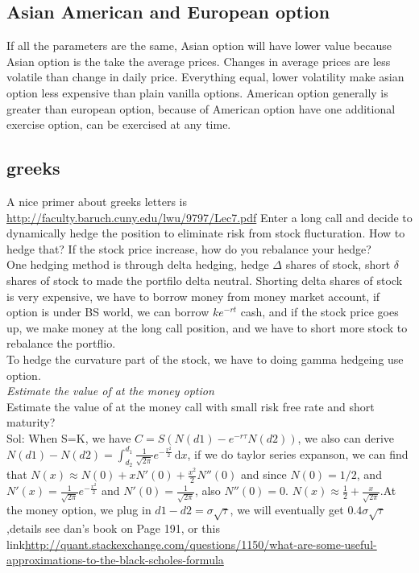 \documentclass[a4paper,11pt]{article}
\begin{document}
\subsection{Asian American and European option}
If all the parameters are the same, Asian option will have lower value because Asian option is the take the average prices. Changes in average prices are less volatile than change in daily price. Everything equal, lower volatility make asian option less expensive than plain vanilla options. American option generally is greater than european option, because of American option have one additional exercise option, can be exercised at any time.
\subsection{greeks}
A nice primer about greeks letters is \url{http://faculty.baruch.cuny.edu/lwu/9797/Lec7.pdf}
Enter a long call and decide to dynamically hedge the position to eliminate risk from stock flucturation. How to hedge that? If the stock price increase, how do you rebalance your hedge?\\
One hedging method is through delta hedging, hedge $\Delta$ shares of stock, short $\delta$ shares of stock to made the portfilo delta neutral. Shorting delta shares of stock is very expensive, we have to borrow money from money market account, if option is under BS world, we can borrow $ke^{-rt}$ cash, and if the stock price goes up, we make money at the long call position, and we have to short more stock to rebalance the portflio. \\
To hedge the curvature part of the stock, we have to doing gamma hedgeing use option.\\
{\em Estimate the value of at the money option}\\
Estimate the value of at the money call with small risk free rate and short maturity?\\
Sol: When S=K, we have $C=S(N(d1)-e^{-r\tau}N(d2))$, we also can derive $N(d1)-N(d2)=\int_{d_2}^{d_1} \! \frac{1}{\sqrt{2\pi}} e^{-\frac{x^{2}}{2}}\, \mathrm{d}x$, if we do taylor series expanson, we can find that $N(x)\approx  N(0)+xN'(0)+\frac{x^2}{2}N''(0)$ and since $N(0)=1/2$, and $N'(x)=\frac{1}{\sqrt{2\pi}}e^{-\frac{x^2}{2}}$ and $N'(0)=\frac{1}{\sqrt{2\pi}}$, also $N''(0)=0$. $N(x)\approx \frac{1}{2}+\frac{x}{\sqrt{2\pi}}$.At the money option, we plug in $d1-d2=\sigma\sqrt{\tau}$, we will eventually get $0.4\sigma\sqrt{\tau}$,details see dan's book on Page 191, or this link\url{http://quant.stackexchange.com/questions/1150/what-are-some-useful-approximations-to-the-black-scholes-formula}
\end{document}
